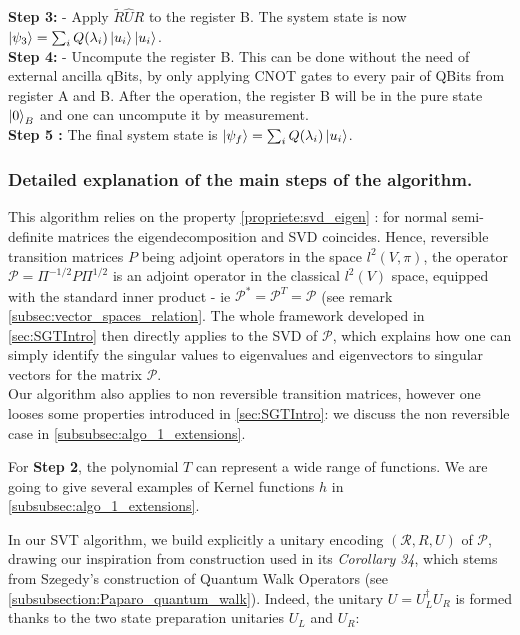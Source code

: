 \documentclass{article}
\begin{document}
\textbf{Step 3:} - Apply $\widetilde{R}\widehat{U} R$ to the register B. The system state is now $\ket{\psi_3} = \sum_i Q(\lambda_i) \ket{u_i}\ket{u_i}$.\\

\textbf{Step 4:} - Uncompute the register B. This can be done without the need of external ancilla qBits, by only applying CNOT gates to every pair of QBits from register A and B. After the operation, the register B will be in the pure state $\ket{0}_B$ and one can uncompute it by measurement.\\

\textbf{Step 5 :} The final system state is $\ket{\psi_f} = \sum_i Q(\lambda_i) \ket{u_i}$.

\subsubsection{Detailed explanation of the main steps of the algorithm.}\label{subsubsec:algo_1_explanation}

This algorithm relies on the property \ref{propriete:svd_eigen} : for normal semi-definite matrices the eigendecomposition and SVD coincides. Hence, reversible transition matrices $P$ being adjoint operators in the space $l^2(V, \pi)$, the operator $\mathcal{P} = \Pi^{-1/2} P \Pi^{1/2}$ is an adjoint operator in the classical $l^2(V)$ space, equipped with the standard inner product - ie $\mathcal{P}^* = \mathcal{P}^T = \mathcal{P}$ (see remark \ref{subsec:vector_spaces_relation}. The whole framework developed in \ref{sec:SGTIntro} then directly applies to the SVD of $\mathcal{P}$, which explains how one can simply identify the singular values to eigenvalues and eigenvectors to singular vectors for the matrix $\mathcal{P}$.\\
Our algorithm also applies to non reversible transition matrices, however one looses some properties introduced in \ref{sec:SGTIntro}: we discuss the non reversible case in \ref{subsubsec:algo_1_extensions}.

For \textbf{Step 2}, the polynomial $T$ can represent a wide range of functions. We are going to give several examples of Kernel functions $h$ in \ref{subsubsec:algo_1_extensions}.  

In our SVT algorithm, we build explicitly a unitary encoding $(\mathcal{R}, R, U)$ of $\mathcal{P}$, drawing our inspiration from \cite{gilyén_su_low_wiebe_2019} construction used in its \textit{Corollary 34}, which stems from Szegedy's construction of Quantum Walk Operators (see \ref{subsubsection:Paparo_quantum_walk}). Indeed, the unitary $U = U_L^\dagger U_R$ is formed thanks to the two state preparation unitaries $U_L$ and $U_R$:
\end{document}
